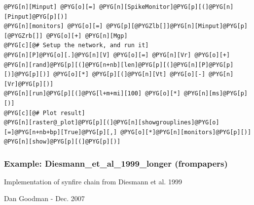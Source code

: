 \documentclass[letterpaper,10pt,english]{manual}
\begin{document}
\begin{Verbatim}[commandchars=@\[\]]
@PYG[n][Minput] @PYG[o][=] @PYG[n][SpikeMonitor]@PYG[p][(]@PYG[n][Pinput]@PYG[p][)]
@PYG[n][monitors] @PYG[o][=] @PYG[p][@PYGZlb[]]@PYG[n][Minput]@PYG[p][@PYGZrb[]] @PYG[o][+] @PYG[n][Mgp]
@PYG[c][@# Setup the network, and run it]
@PYG[n][P]@PYG[o][.]@PYG[n][V] @PYG[o][=] @PYG[n][Vr] @PYG[o][+] @PYG[n][rand]@PYG[p][(]@PYG[n+nb][len]@PYG[p][(]@PYG[n][P]@PYG[p][)]@PYG[p][)] @PYG[o][*] @PYG[p][(]@PYG[n][Vt] @PYG[o][-] @PYG[n][Vr]@PYG[p][)]
@PYG[n][run]@PYG[p][(]@PYG[l+m+mi][100] @PYG[o][*] @PYG[n][ms]@PYG[p][)]
@PYG[c][@# Plot result]
@PYG[n][raster@_plot]@PYG[p][(]@PYG[n][showgrouplines]@PYG[o][=]@PYG[n+nb+bp][True]@PYG[p][,] @PYG[o][*]@PYG[n][monitors]@PYG[p][)]
@PYG[n][show]@PYG[p][(]@PYG[p][)]
\end{Verbatim}

\resetcurrentobjects
\hypertarget{--doc-examples-frompapers_Diesmann_et_al_1999_longer}{}

\hypertarget{index-29}{}\subsubsection{Example: Diesmann\_et\_al\_1999\_longer (frompapers)}

Implementation of synfire chain from Diesmann et al. 1999

Dan Goodman - Dec. 2007
\end{document}
